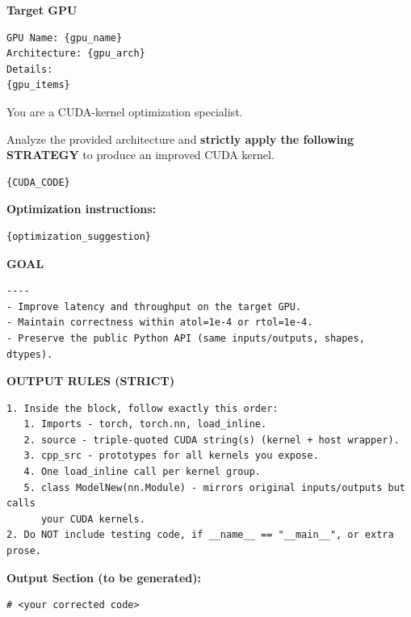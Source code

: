 \begin{tcolorbox}[mybox, title={Prompt for Kernel Optimization}]
\ttfamily %

\textbf{Target GPU}
\begin{verbatim}
GPU Name: {gpu_name}
Architecture: {gpu_arch}
Details:
{gpu_items}
\end{verbatim}

You are a CUDA-kernel optimization specialist.

Analyze the provided architecture and \textbf{strictly apply the following STRATEGY} to produce an improved CUDA kernel.

\begin{tcolorbox}[colback=white, colframe=gray!50, left=2mm, right=2mm, top=1mm, bottom=1mm]
\footnotesize
\begin{verbatim}
{CUDA_CODE}
\end{verbatim}
\end{tcolorbox}


\textbf{Optimization instructions:}
\begin{verbatim}
{optimization_suggestion}
\end{verbatim}

\medskip
\textbf{GOAL}
\begin{verbatim}
----
- Improve latency and throughput on the target GPU.
- Maintain correctness within atol=1e-4 or rtol=1e-4.
- Preserve the public Python API (same inputs/outputs, shapes, dtypes).
\end{verbatim}

\medskip
\textbf{OUTPUT RULES (STRICT)}
\begin{verbatim}
1. Inside the block, follow exactly this order:
   1. Imports - torch, torch.nn, load_inline.
   2. source - triple-quoted CUDA string(s) (kernel + host wrapper).
   3. cpp_src - prototypes for all kernels you expose.
   4. One load_inline call per kernel group.
   5. class ModelNew(nn.Module) - mirrors original inputs/outputs but calls
      your CUDA kernels.
2. Do NOT include testing code, if __name__ == "__main__", or extra prose.
\end{verbatim}

\medskip
\textbf{Output Section (to be generated):}
\begin{tcolorbox}[colback=white, colframe=gray!50, left=2mm, right=2mm, top=1mm, bottom=1mm]
\footnotesize
\begin{verbatim}
# <your corrected code>
\end{verbatim}
\end{tcolorbox}

\normalfont %
\end{tcolorbox}



